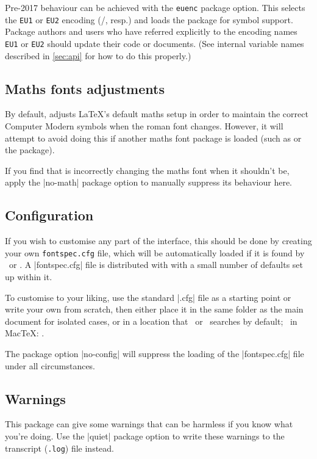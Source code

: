 \documentclass[a4paper]{l3doc}
\begin{document}
Pre-2017 behaviour can be achieved with the \texttt{euenc} package option.
This selects the \texttt{EU1} or \texttt{EU2} encoding (\XeTeX/\LuaTeX, resp.) and loads the  package for symbol support.
Package authors and users who have referred explicitly to the encoding names \texttt{EU1} or \texttt{EU2} should update their code or documents.
(See internal variable names described in \vref{sec:api} for how to do this properly.)


\subsection{Maths fonts adjustments}
By default,  adjusts \LaTeX's default maths setup in order to maintain the correct Computer Modern symbols when the roman font changes.
However, it will attempt to avoid doing this if another maths font package is loaded (such as  or the  package).

If you find that  is incorrectly changing the maths font when it shouldn't be, apply the |no-math| package option to manually suppress its behaviour here.


\subsection{Configuration}
\label{sec:config}

If you wish to customise any part of the
 interface, this should be done by creating your own
\texttt{fontspec.cfg} file,
which will be automatically loaded if it is found by \XeTeX\ or \LuaTeX.
A |fontspec.cfg| file is distributed with  with a small number of defaults set up within it.

To customise  to your liking, use the standard |.cfg| file as a starting point or write your own from scratch, then either place it in the same folder as the main document for isolated cases, or in a location
that \XeTeX\ or \LuaTeX\ searches by default; \eg\ in Mac\TeX: .

The package option |no-config| will suppress the loading of the |fontspec.cfg| file under all circumstances.


\subsection{Warnings}
\label{sec:quiet-warnings}

This package can give some warnings that can be harmless if you know what
you're doing. Use the |quiet| package option to write these warnings to the
transcript (\texttt{.log}) file instead.
\end{document}
